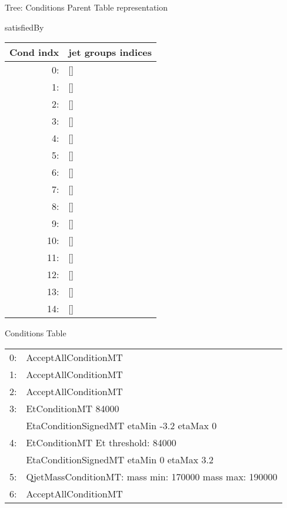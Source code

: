 \documentclass{beamer}
\begin{document}
\begin{frame}[fragile=singleslide]
\begin{minipage}[t]{0.48\linewidth}
\begin{block}{Tree: Conditions Parent Table representation}
\begin{center}
\begin{tiny}
\end{tiny}
\end{center}
\end{block}
\end{minipage}
\begin{minipage}[t]{0.38\linewidth}
\begin{block}{satisfiedBy}
\begin{center}
\begin{tiny}
\begin{tabular}{r|l}
Cond indx& jet groups indices\\ \hline
0: & [] \\
1: & [] \\
2: & [] \\
3: & [] \\
4: & [] \\
5: & [] \\
6: & [] \\
7: & [] \\
8: & [] \\
9: & [] \\
10:& [] \\
11:& [] \\
12:& [] \\
13:& [] \\
14:& [] \\
\end{tabular}
\end{tiny}
\end{center}
\end{block}
\end{minipage}\hfill
\begin{minipage}[t]{0.58\linewidth}
\begin{block}{Conditions Table}
\begin{tiny}
\begin{tabular}{ll}
  0: & AcceptAllConditionMT\\
  1: & AcceptAllConditionMT\\
  2: & AcceptAllConditionMT\\
  3: & EtConditionMT 84000 \\
     & EtaConditionSignedMT etaMin -3.2 etaMax 0 \\
  4: & EtConditionMT Et threshold: 84000 \\
     & EtaConditionSignedMT etaMin 0 etaMax 3.2 \\
  5: & QjetMassConditionMT: mass min: 170000 mass max: 190000 \\
  6: & AcceptAllConditionMT\\

\end{tabular}
\end{tiny}
\end{block}
\end{minipage}
\end{frame}
\end{document}
